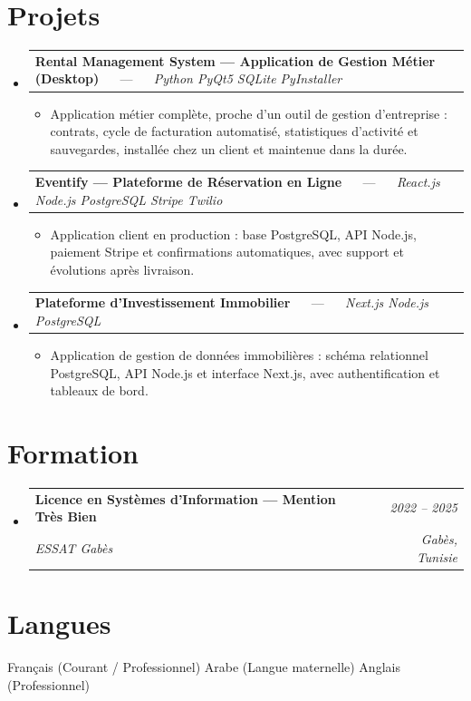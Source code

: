 \documentclass[letterpaper,9pt]{article}
\makeatletter
\newcommand{\resumeItem}[1]{\item\small{#1}}
\newcommand{\resumeSubheading}[4]{
  \vspace{-1pt}\item
  \begin{tabular*}{0.97\textwidth}[t]{l@{\extracolsep{\fill}}r}
    \textbf{#1} & \textit{\color{greytext}#2} \\
    \textit{\small\color{greytext} #3} & \textit{\small\color{greytext} #4}
  \end{tabular*}\vspace{-2pt}
}
\newcommand{\resumeProjectHeading}[2]{
  \item
  \begin{tabular*}{0.97\textwidth}{l@{\extracolsep{\fill}}r}
    \small #1 & #2
  \end{tabular*}\vspace{-1pt}
}
\newcommand{\resumeSubHeadingListStart}{\begin{itemize}[leftmargin=0.18in, label={}, itemsep=1.2pt, topsep=2.5pt, parsep=0pt]}
\newcommand{\resumeSubHeadingListEnd}{\end{itemize}\vspace{-2pt}}
\newcommand{\resumeProjectListStart}{\begin{itemize}[leftmargin=0.24in, label={}, itemsep=0.9pt, topsep=1.2pt, parsep=0pt]}
\newcommand{\resumeProjectListEnd}{\end{itemize}\vspace{-2pt}}
\makeatother
\begin{document}
\section{Projets}
\resumeSubHeadingListStart

  \resumeProjectHeading{\textbf{Rental Management System --- Application de Gestion Métier (Desktop)} $\quad$ --- $\quad$ \emph{\color{greytext}Python \textperiodcentered{} PyQt5 \textperiodcentered{} SQLite \textperiodcentered{} PyInstaller}}{}
    \resumeProjectListStart
      \resumeItem{Application métier complète, proche d'un outil de gestion d'entreprise : contrats, cycle de facturation automatisé, statistiques d'activité et sauvegardes, installée chez un client et maintenue dans la durée.}
    \resumeProjectListEnd

  \resumeProjectHeading{\textbf{Eventify --- Plateforme de Réservation en Ligne} $\quad$ --- $\quad$ \emph{\color{greytext}React.js \textperiodcentered{} Node.js \textperiodcentered{} PostgreSQL \textperiodcentered{} Stripe \textperiodcentered{} Twilio}}{}
    \resumeProjectListStart
      \resumeItem{Application client en production : base PostgreSQL, API Node.js, paiement Stripe et confirmations automatiques, avec support et évolutions après livraison.}
    \resumeProjectListEnd

  \resumeProjectHeading{\textbf{Plateforme d'Investissement Immobilier} $\quad$ --- $\quad$ \emph{\color{greytext}Next.js \textperiodcentered{} Node.js \textperiodcentered{} PostgreSQL}}{}
    \resumeProjectListStart
      \resumeItem{Application de gestion de données immobilières : schéma relationnel PostgreSQL, API Node.js et interface Next.js, avec authentification et tableaux de bord.}
    \resumeProjectListEnd

\resumeSubHeadingListEnd\vspace{-3pt}

\section{Formation}
\resumeSubHeadingListStart
  \resumeSubheading{Licence en Systèmes d'Information --- Mention Très Bien}{2022 -- 2025}{ESSAT Gabès}{Gabès, Tunisie}
\resumeSubHeadingListEnd\vspace{-1pt}

\section{Langues}
\begin{itemize}[leftmargin=0.18in, label={}, topsep=2pt, itemsep=1pt, parsep=0pt]
\footnotesize{
  \item Français (Courant / Professionnel) \textperiodcentered{} Arabe (Langue maternelle) \textperiodcentered{} Anglais (Professionnel)
}
\end{itemize}
\end{document}
